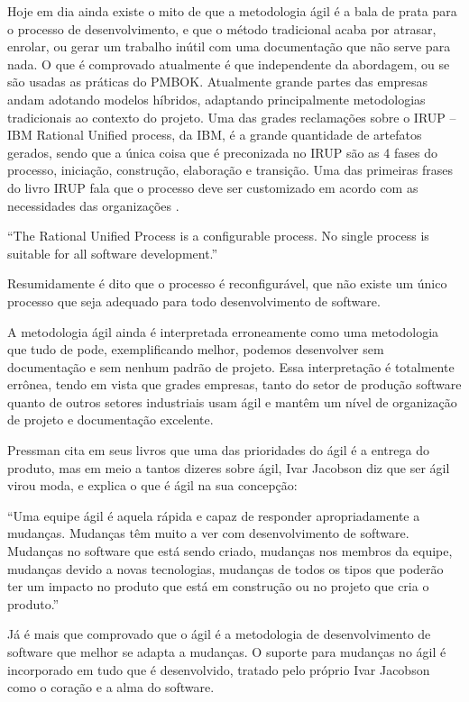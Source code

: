Hoje em dia ainda existe o mito de que a metodologia ágil é a bala de prata para o processo de desenvolvimento, e que o método tradicional acaba por atrasar, enrolar, ou gerar um trabalho inútil com uma documentação que não serve para nada. O que é comprovado atualmente é que independente da abordagem, ou se são usadas as práticas do PMBOK.
Atualmente grande partes das empresas andam adotando modelos híbridos, adaptando principalmente metodologias tradicionais ao contexto do projeto. Uma das grades reclamações sobre o IRUP – IBM Rational Unified process, da IBM, é a grande quantidade de artefatos gerados, sendo que a única coisa que é preconizada no IRUP são as 4 fases do processo, iniciação, construção, elaboração e transição. Uma das primeiras frases do livro IRUP fala que o processo deve ser customizado em acordo com as necessidades das organizações \cite {rup}.

“The Rational Unified Process is a configurable process. No single process is suitable for all software development.”

Resumidamente é dito que o processo é reconfigurável, que não existe um único processo que seja adequado para todo desenvolvimento de software.

A metodologia ágil ainda é interpretada erroneamente como uma metodologia que tudo de pode, exemplificando melhor, podemos desenvolver sem documentação e sem nenhum padrão de projeto. Essa interpretação é totalmente errônea, tendo em vista que grades empresas, tanto do setor de produção software quanto de outros setores industriais usam ágil e mantêm um nível de organização de projeto e documentação excelente.

Pressman cita em seus livros que uma das prioridades do ágil é a entrega do produto, mas em meio a tantos dizeres sobre ágil, Ivar Jacobson diz que ser ágil virou moda, e explica o que é ágil na sua concepção:

“Uma equipe ágil é aquela rápida e capaz de responder apropriadamente a mudanças. Mudanças têm muito a ver com desenvolvimento de software. Mudanças no software que está sendo criado, mudanças nos membros da equipe, mudanças devido a novas tecnologias, mudanças de todos os tipos que poderão ter um impacto no produto que está em construção ou no projeto que cria o produto.”

Já é mais que comprovado que o ágil é a metodologia de desenvolvimento de software que melhor se adapta a mudanças. O suporte para mudanças no ágil é incorporado em tudo que é desenvolvido, tratado pelo próprio Ivar Jacobson como o coração e a alma do software.
